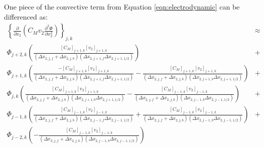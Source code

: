 \documentclass[11pt,letterpaper]{article}
\begin{document}
One piece of the convective term from Equation \ref{eqn:electrodynamic} can be differenced as:  
\begin{eqnarray}
\left\{ \frac{\partial}{\partial x_2} \left( C_M v_2 \frac{\partial^2 \Phi }{\partial x_2^2} \right) \right\}_{j,k} &\approx& \nonumber \\
\Phi_{j+2,k} \left( \frac{[C_M]_{j+1,k} [v_{2}]_{j+1,k}}{\left( \Delta x_{2,j,f} + \Delta x_{2,j,b} \right) \left( \Delta x_{2,j+1,f} \Delta x_{2,j+1,1/2} \right)} \right) &+& \nonumber \\
\Phi_{j+1,k} \left( \frac{-[C_M]_{j+1,k} [v_{2}]_{j+1,k}}{\left( \Delta x_{2,j,f} + \Delta x_{2,j,b} \right) \left( \Delta x_{2,j+1,f} \Delta x_{2,j+1,1/2} \right)} - \frac{[C_M]_{j+1,k} [v_{2}]_{j+1,k}}{\left( \Delta x_{2,j,f} + \Delta x_{2,j,b} \right) \left( \Delta x_{2,j+1,b} \Delta x_{2,j+1,1/2} \right)} \right) &+& \nonumber \\
\Phi_{j,k} \left(  \frac{[C_M]_{j+1,k} [v_{2}]_{j+1,k}}{\left( \Delta x_{2,j,f} + \Delta x_{2,j,b} \right) \left( \Delta x_{2,j+1,b} \Delta x_{2,j+1,1/2} \right)}  - \frac{[C_M]_{j-1,k} [v_{2}]_{j-1,k}}{\left( \Delta x_{2,j,f} + \Delta x_{2,j,b} \right) \left( \Delta x_{2,j-1,b} \Delta x_{2,j-1,1/2} \right)}  \right) &+& \nonumber \\
\Phi_{j-1,k} \left( \frac{[C_M]_{j-1,k} [v_{2}]_{j-1,k}}{\left( \Delta x_{2,j,f} + \Delta x_{2,j,b} \right) \left( \Delta x_{2,j-1,f} \Delta x_{2,j-1,1/2} \right)} + \frac{[C_M]_{j-1,k} [v_{2}]_{j-1,k}}{\left( \Delta x_{2,j,f} + \Delta x_{2,j,b} \right) \left( \Delta x_{2,j-1,b} \Delta x_{2,j-1,1/2} \right)} \right) &+& \nonumber \\
\Phi_{j-2,k} \left( - \frac{[C_M]_{j-1,k} [v_{2}]_{j-1,k}}{\left( \Delta x_{2,j,f} + \Delta x_{2,j,b} \right) \left( \Delta x_{2,j-1,b} \Delta x_{2,j-1,1/2} \right)} \right)
\end{eqnarray}
\end{document}

